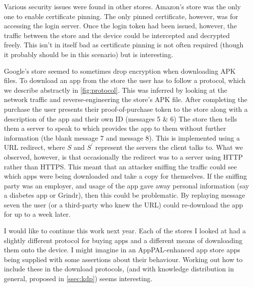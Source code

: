 \documentclass[a4paper]{scrartcl}
\begin{document}
Various security issues were found in other stores.
Amazon's store was the only one to enable certificate pinning.
The only pinned certificate, however, was for accessing the login server.
Once the login token had been issued, however, the traffic between the store and the device could be intercepted and decrypted freely.
This isn't in itself bad as certificate pinning is not often required (though it probably should be in this scenario) but is interesting.

Google's store seemed to sometimes drop encryption when downloading APK files.
To download an app from the store the user has to follow a protocol, which we describe abstractly in \autoref{fig:protocol}.
This was inferred by looking at the network traffic and reverse-engineering the store's APK file.
After completing the purchase the user presents their proof-of-purchase token to the store along with a description of the app and their own ID (messages 5 \& 6)
The store then tells them a server to speak to which provides the app to them without further information (the blank message 7 and message 8).
This is implemented using a URL redirect, where $S$ and $S^\prime$ represent the servers the client talks to.
What we observed, however, is that occasionally the redirect was to a server using HTTP rather than HTTPS.
This meant that an attacker sniffing the traffic could see which apps were being downloaded and take a copy for themselves.
If the sniffing party was an employer, and usage of the app gave away personal information (say a diabetes app or Grindr), then this could be problematic.
By replaying message seven the user (or a third-party who knew the URL) could re-download the app for up to a week later.

I would like to continue this work next year.
Each of the stores I looked at had a slightly different protocol for buying apps and a different means of downloading them onto the device.
I might imagine in an AppPAL-enhanced app store apps being supplied with some assertions about their behaviour.
Working out how to include these in the download protocols, (and with knowledge distribution in general, proposed in \autoref{ssec:kdp}) seems interesting.
\end{document}

